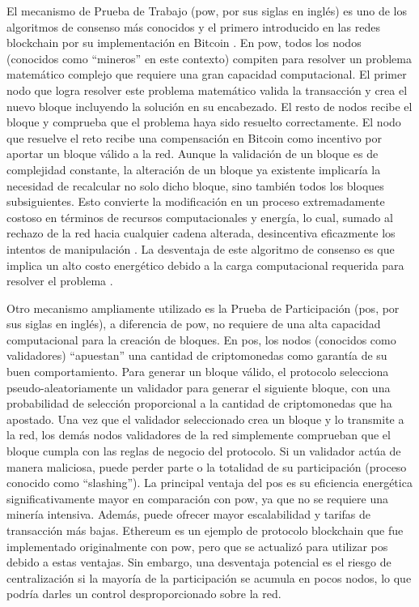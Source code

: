 El mecanismo de Prueba de Trabajo (\acrlong{pow}, por sus siglas en inglés) es uno de los algoritmos de consenso más conocidos y el primero introducido en las redes blockchain por su implementación en Bitcoin \cite{satoshi2008bitcoin}. En \acrshort{pow}, todos los nodos (conocidos como ``mineros'' en este contexto) compiten para resolver un problema matemático complejo que requiere una gran capacidad computacional. El primer nodo que logra resolver este problema matemático valida la transacción y crea el nuevo bloque incluyendo la solución en su encabezado. El resto de nodos recibe el bloque y comprueba que el problema haya sido resuelto correctamente. El nodo que resuelve el reto recibe una compensación en Bitcoin como incentivo por aportar un bloque válido a la red. Aunque la validación de un bloque es de complejidad constante, la alteración de un bloque ya existente implicaría la necesidad de recalcular no solo dicho bloque, sino también todos los bloques subsiguientes. Esto convierte la modificación en un proceso extremadamente costoso en términos de recursos computacionales y energía, lo cual, sumado al rechazo de la red hacia cualquier cadena alterada, desincentiva eficazmente los intentos de manipulación \cite{satoshi2008bitcoin}. La desventaja de este algoritmo de consenso es que implica un alto costo energético debido a la carga computacional requerida para resolver el problema \cite{pending}.

Otro mecanismo ampliamente utilizado es la Prueba de Participación (\acrlong{pos}, por sus siglas en inglés), a diferencia de \acrshort{pow}, no requiere de una alta capacidad computacional para la creación de bloques. En \acrshort{pos}, los nodos (conocidos como validadores) ``apuestan'' una cantidad de criptomonedas como garantía de su buen comportamiento. Para generar un bloque válido, el protocolo selecciona pseudo-aleatoriamente un validador para generar el siguiente bloque, con una probabilidad de selección proporcional a la cantidad de criptomonedas que ha apostado. Una vez que el validador seleccionado crea un bloque y lo transmite a la red, los demás nodos validadores de la red simplemente comprueban que el bloque cumpla con las reglas de negocio del protocolo. Si un validador actúa de manera maliciosa, puede perder parte o la totalidad de su participación (proceso conocido como ``slashing''). La principal ventaja del \acrshort{pos} es su eficiencia energética significativamente mayor en comparación con \acrshort{pow}, ya que no se requiere una minería intensiva. Además, puede ofrecer mayor escalabilidad y tarifas de transacción más bajas. Ethereum es un ejemplo de protocolo blockchain que fue implementado originalmente con \acrshort{pow}, pero que se actualizó para utilizar \acrshort{pos} debido a estas ventajas. Sin embargo, una desventaja potencial es el riesgo de centralización si la mayoría de la participación se acumula en pocos nodos, lo que podría darles un control desproporcionado sobre la red.

